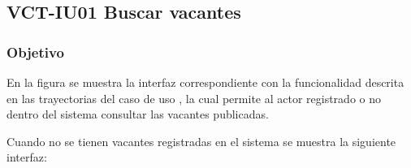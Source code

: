 \clearpage
\subsection{VCT-IU01 Buscar vacantes}

\subsubsection{Objetivo}
En la figura  se muestra la interfaz correspondiente con la funcionalidad descrita en las
trayectorias del caso de uso  , la cual permite al actor registrado o no dentro del sistema consultar 
las vacantes publicadas.



 

Cuando no se tienen vacantes registradas en el sistema se muestra la siguiente interfaz:
\clearpage
